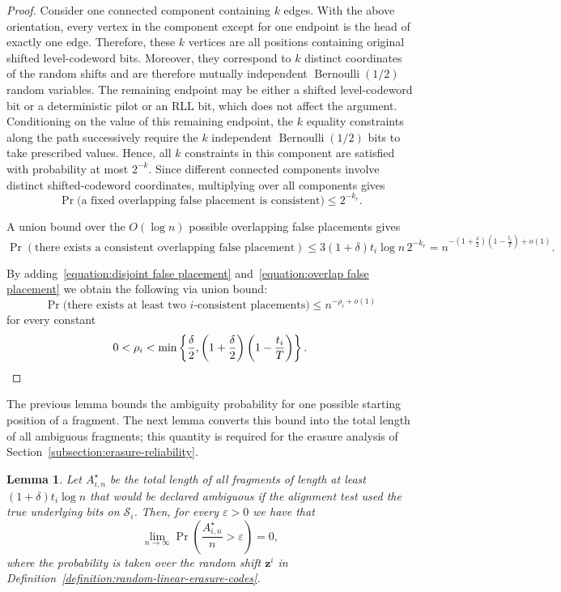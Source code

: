 \documentclass[journal,letterpaper,onecolumn,11pt]{IEEEtran}
\newcommand{\cS}{\mathcal{S}}
\newcommand{\boldz}{\mathbf{z}}
\newtheorem{lemma}{Lemma}
\begin{document}
\begin{proof}
Consider one connected component containing \(k\) edges. With the above
orientation, every vertex in the component except for one endpoint is
the head of exactly one edge. Therefore, these \(k\) vertices are all
positions containing original shifted level-codeword bits. Moreover,
they correspond to \(k\) distinct coordinates of the random shifts and
are therefore mutually independent
\(\operatorname{Bernoulli}(1/2)\) random variables. The remaining
endpoint may be either a shifted level-codeword bit or a deterministic
pilot or an RLL bit, which does not affect the argument.
Conditioning on the value of this remaining endpoint, the \(k\)
equality constraints along the path successively require the \(k\)
independent \(\operatorname{Bernoulli}(1/2)\) bits to take prescribed
values. Hence, all \(k\) constraints in this component are satisfied
with probability at most \(2^{-k}\). Since different connected
components involve distinct shifted-codeword coordinates, multiplying
over all components gives
\[
\Pr\bigl(
\text{a fixed overlapping false placement is consistent}
\bigr)
\leq
2^{-k_r}.
\]

A union bound over the \(O(\log n)\) possible overlapping false placements gives
\begin{equation}\label{equation:overlap false placement}
    \Pr\left(
\text{there exists a consistent overlapping false placement}
\right)\leq
3(1+\delta)t_i\log n\,2^{-k_{r}}=
n^{-
\left(1+\frac{\delta}{2}\right)
\left(1-\frac{t_i}{T}\right)+o(1)}.
\end{equation}


By adding~\eqref{equation:disjoint false placement} and~\eqref{equation:overlap false placement} we obtain the following via union bound:
\[
\Pr\bigl(\text{there exists at least two $i$-consistent placements})
\leq
n^{-\rho_i+o(1)}
\]
for every constant
\[
0<\rho_i<
\min\left\{
\frac{\delta}{2},
\left(1+\frac{\delta}{2}\right)
\left(1-\frac{t_i}{T}\right)
\right\}.\qedhere
\]
\end{proof}

The previous lemma bounds the ambiguity probability for one possible
starting position of a fragment.  
The next lemma converts this bound into the total length of all ambiguous fragments; this quantity is required for the erasure analysis
of Section~\ref{subsection:erasure-reliability}.

\begin{lemma}\label{lemma:vanishing-ambiguous-mass}
Let $A_{i,n}^{\star}$ be the total length of all fragments of length
at least $(1+\delta)t_i\log n$ that would be declared ambiguous if the
alignment test used the true underlying bits on $\cS_i$. 
Then, for every $\varepsilon > 0$ we have that
$$
\lim_{n\to\infty} \Pr\left(\frac{A_{i,n}^{\star}}{n} > \varepsilon\right) = 0,
$$
where the probability is taken over the random shift $\boldz^i$ in Definition~\ref{definition:random-linear-erasure-codes}.
\end{lemma}
\end{document}
